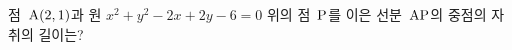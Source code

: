 점~$\mathrm{A}(2{,}\mkern3mu\mathopen{}1)$과 원 $x^2+y^2-2x+2y-6=0$ 위의 점~$\mathrm{P}$를 이은 선분~$\mathrm{AP}$의 중점의 자취의 길이는?
